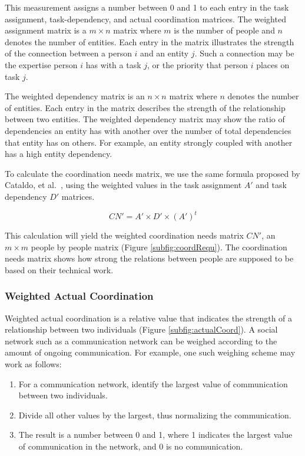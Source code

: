 \documentclass[12pt,oneside]{book}
\begin{document}
This measurement assigns a number between 0 and 1 to each entry in the task assignment, task-dependency, and actual coordination matrices.
The weighted assignment matrix is a $m\times n$ matrix where $m$ is the number of people and $n$ denotes the number of entities. 
Each entry in the matrix illustrates the strength of the connection between a person $i$ and an entity $j$. Such a connection may be the expertise person $i$ has with a task $j$, or the priority that person $i$ places on task $j$.

The weighted dependency matrix is an $n\times n$ matrix where $n$ denotes the number of entities.
Each entry in the matrix describes the strength of the relationship between two entities. The weighted dependency matrix may show the ratio of dependencies an entity has with another over the number of total dependencies that entity has on others. 
For example, an entity strongly coupled with another has a high entity dependency.

To calculate the coordination needs matrix, we use the same formula proposed by Cataldo, et al.~\cite{cataldo:cscw:2006}, using the weighted values in the task assignment $A'$ and task dependency $D'$ matrices.

\[ CN' = A' \times D' \times (A')^t \]

\noindent This calculation will yield the weighted coordination needs matrix $CN'$, an $m\times m$ people by people matrix (Figure \ref{subfig:coordRequ}).
The coordination needs matrix shows how strong the relations between people are supposed to be based on their technical work.

\subsubsection{Weighted Actual Coordination}

Weighted actual coordination is a relative value that indicates the strength of a relationship between two individuals (Figure \ref{subfig:actualCoord}). A social network such as a communication network can be weighed according to the amount of ongoing communication. For example, one such weighing scheme may work as follows:

\begin{enumerate}
\item For a communication network, identify the largest value of communication between two individuals.
\item Divide all other values by the largest, thus normalizing the communication.
\item The result is a number between 0 and 1, where 1 indicates the largest value of communication in the network, and 0 is no communication.
\end{enumerate}
\end{document}
